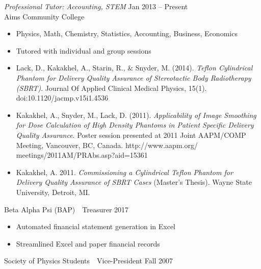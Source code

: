 \documentclass[10pt]{article}
\begin{document}
\begin{description}[leftmargin=!,labelwidth=3cm,align=left,itemsep=-9px,partopsep=-5px]
    \textit{Professional Tutor: Accounting, STEM} \hfill Jan 2013 -- Present\\
    Aims Community College
    \begin{itemize}[rightmargin=2cm,noitemsep]%
        \item Physics, Math, Chemistry, Statistics, Accounting, Business, Economics
        \item Tutored with individual and group sessions
    \end{itemize}
\item[\rule{196mm}{0.5pt}]
%
%
\item[Research]
    \begin{itemize}[rightmargin=2cm]%
        \item Lack, D., Kakakhel, A., Starin, R., \& Snyder, M. (2014). \textit{Teflon Cylindrical Phantom for Delivery Quality Assurance of Stereotactic Body Radiotherapy (SBRT)}. Journal Of Applied Clinical Medical Physics, 15(1). doi:10.1120/jacmp.v15i1.4536
        \item Kakakhel, A., Snyder, M., Lack, D. (2011). \textit{Applicability of Image Smoothing for Dose Calculation of High Density Phantoms in Patient Specific Delivery Quality Assurance}. Poster session presented at 2011 Joint AAPM/COMP Meeting, Vancouver, BC, Canada. http://www.aapm.org/ \\ meetings/2011AM/PRAbs.asp?aid=15361
        \item Kakakhel, A. 2011. \textit{Commissioning a Cylindrical Teflon Phantom for Delivery Quality Assurance of SBRT Cases} (Master's Thesis). Wayne State University, Detroit, MI.
    \end{itemize}
\item[\rule{196mm}{0.5pt}]

%
%
\item[Leadership]
    Beta Alpha Psi (BAP)\ \ Treasurer \hfill 2017
    \begin{itemize}[rightmargin=2cm,noitemsep]%
        \item Automated financial statement generation in Excel
        \item Streamlined Excel and paper financial records
    \end{itemize}
    Society of Physics Students\ \ Vice-President \hfill Fall 2007
\item[\rule{196mm}{0.5pt}]


\end{description}
\end{document}
